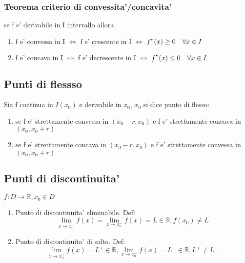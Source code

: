 \documentclass{article}
\begin{document}
        \subsubsection{Teorema criterio di convessita'/concavita'}
        \begin{flushleft}
          se f e' derivabile in I intervallo allora 
          \begin{enumerate}
            \item f e' convessa in I $\iff$ f e' crescente in I $\iff$ $f"(x) \geq 0 \quad \forall x \in I$
            \item f e' concava in I $\iff$ f e' decrescente in I $\iff$ $f"(x) \leq 0 \quad \forall x \in I$
          \end{enumerate}
        \end{flushleft}
        \subsection{Punti di flessso}
        \begin{flushleft}
          Sia f continua in $I(x_0)$ e derivabile in $x_0$, $x_0$ si dice punto di flesso:
          \begin{enumerate}
            \item se f e' strettamente convessa in $(x_0-r,x_0)$ e f e' strettamente concava in $(x_0,x_0+r)$
            \item se f e' strettamente concava in $(x_0-r,x_0)$ e f e' strettamente convessa in $(x_0,x_0+r)$
          \end{enumerate}
        \end{flushleft}
        \subsection{Punti di discontinuita'}
        \begin{flushleft}
          $f:D \to \mathbb{R}, x_0 \in D$
        \end{flushleft}
        \begin{enumerate}
          \item Punto di discontinuita' eliminabile. Def:
            \begin{equation}
              \lim_{x \to x_0^+} f(x) = \lim_{x \to x_0^-} f(x)= L \in \mathbb{R}, f(x_0) \neq L
            \end{equation}
          \item Punto di discontinuita' di salto. Def:
            \begin{equation}
              \lim_{x \to x_0^+} f(x) = L^+ \in \mathbb{R},\lim_{x \to x_0^-} f(x) = L^- \in \mathbb{R},L^+ \neq L^-
            \end{equation}
        \end{enumerate}
\end{document}
